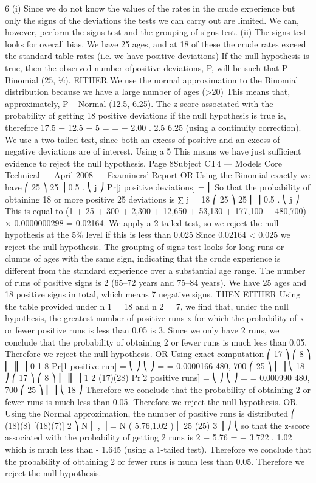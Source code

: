 \documentclass[a4paper,12pt]{article}
\begin{document}
6
(i)
Since we do not know the values of the rates in the crude experience but only the signs of the deviations the
tests we can carry out are limited. We can, however, perform the signs test and the grouping
of signs test.
(ii)
The signs test looks for overall bias. We have 25 ages, and at 18 of these the crude rates exceed the standard table rates (i.e. we have positive deviations) If the null hypothesis is true, then the observed number ofpositive deviations, P, will be such that P ~ Binomial (25, 1⁄2).
EITHER
We use the normal approximation to the Binomial distribution because we have a large number of ages (>20)
This means that, approximately, P ~ Normal (12.5, 6.25).
The z-score associated with the probability of getting 18 positive deviations if the null hypothesis is true is, therefore
17.5 − 12.5 − 5
=
= − 2.00 .
2.5
6.25
(using a continuity correction).
We use a two-tailed test, since both an excess of
positive and an excess of negative deviations are of interest.
Using a 5 %
This means we have just sufficient evidence to reject the
null hypothesis.
Page 8Subject CT4 — Models Core Technical — April 2008 — Examiners’ Report
OR
Using the Binomial exactly we have
⎛ 25 ⎞ 25
⎟ 0.5 .
⎝ j ⎠
Pr[j positive deviations] = ⎜
So that the probability of obtaining 18 or more positive
25
deviations is
∑
j = 18
⎛ 25 ⎞ 25
⎜ ⎟ 0.5 .
⎝ j ⎠
This is equal to
(1 + 25 + 300 + 2,300 + 12,650 + 53,130 + 177,100 + 480,700)
× 0.0000000298
= 0.02164.
We apply a 2-tailed test, so we reject the null hypothesis at the 5\% level if this is less than 0.025
Since 0.02164 < 0.025 we reject the null hypothesis.
The grouping of signs test looks for long runs or clumps of ages with the same sign, indicating that the crude
experience is different from the standard experience over a substantial age range.
The number of runs of positive signs is 2 (65–72 years and 75–84 years).
We have 25 ages and 18 positive signs in total, which means 7 negative signs.
THEN EITHER
Using the table provided under n 1 = 18 and n 2 = 7, we find
that, under the null hypothesis, the greatest number of positive runs x for which the probability of x or fewer positive runs
is less than 0.05 is 3. Since we only have 2 runs, we conclude that the probability
of obtaining 2 or fewer runs is much less than 0.05.
Therefore we reject the null hypothesis.
OR
Using exact computation
⎛ 17 ⎞ ⎛ 8 ⎞
⎜ ⎟⎜ ⎟
0 1
8
Pr[1 positive run] = ⎝ ⎠ ⎝ ⎠ =
= 0.0000166
480, 700
⎛ 25 ⎞
⎜ ⎟
⎝ 18 ⎠
⎛ 17 ⎞ ⎛ 8 ⎞
⎜ ⎟⎜ ⎟
1
2
(17)(28)
Pr[2 positive runs] = ⎝ ⎠ ⎝ ⎠ =
= 0.000990
480, 700
⎛ 25 ⎞
⎜ ⎟
⎝ 18 ⎠
Therefore we conclude that the probability of obtaining 2 or fewer runs is much less than 0.05.
Therefore we reject the null hypothesis.
OR
Using the Normal approximation, the number of positive runs is distributed
⎛ (18)(8) [(18)(7)] 2 ⎞
N ⎜
,
⎟ = N ( 5.76,1.02 )
⎜ 25
(25) 3 ⎟ ⎠
⎝
so that the z-score associated with the probability of getting 2 runs
is
2 − 5.76
= − 3.722 .
1.02
which is much less than - 1.645 (using a 1-tailed test).
Therefore we conclude that the probability
of obtaining 2 or fewer runs is much less than 0.05.
Therefore we reject the null hypothesis.
\end{document}
